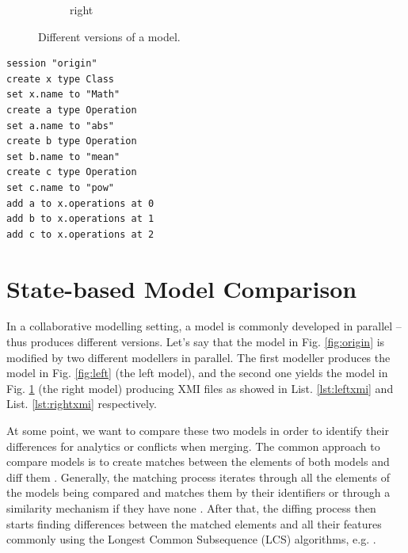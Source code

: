\documentclass{llncs}
\begin{document}
\begin{minipage}[t]{0.59\linewidth}
\begin{figure}[H]
\begin{subfigure}[t]{0.2\linewidth}
    \caption{right}
    \label{fig:right}
\end{subfigure}
\hfill
\label{fig:versions}
\caption{Different versions of a model.}
\end{figure}
\end{minipage}
\hfill
\begin{minipage}[t]{0.39\linewidth}
\begin{lstlisting}[style=eol,caption={The pseudo-formatted CBP of the model in Fig. \ref{fig:origin}.},label=lst:origincbp]
session "origin"
create x type Class
set x.name to "Math" 
create a type Operation
set a.name to "abs" 
create b type Operation
set b.name to "mean" 
create c type Operation
set c.name to "pow" 
add a to x.operations at 0
add b to x.operations at 1
add c to x.operations at 2
\end{lstlisting}
\end{minipage}

\vspace{-5pt}
\section{State-based Model Comparison}
\label{sec:model_comparison}

\vspace{-5pt}
In a collaborative modelling setting, a model is commonly developed in parallel -- thus produces different versions. Let's say that the model in Fig. \ref{fig:origin} is modified by two different modellers in parallel. The first modeller produces the model in Fig. \ref{fig:left} (the left model), and the second one yields the model in Fig. \ref{fig:right} (the right model) producing XMI files as showed in List. \ref{lst:leftxmi} and List. \ref{lst:rightxmi} respectively.

At some point, we want to compare these two models in order to identify their differences for analytics or conflicts when merging. The common approach to compare models is to create matches between the elements of both models and diff them \cite{DBLP:conf/sfm/BroschKLSWW12,emfcompare2018developer}. Generally, the matching process iterates through all the elements of the models being compared and matches them by their identifiers or through a similarity mechanism if they have none \cite{DBLP:conf/sfm/BroschKLSWW12,emfcompare2018developer}. After that, the diffing process then starts finding differences between the matched elements and all their features commonly using the Longest Common Subsequence (LCS) algorithms, e.g. \cite{DBLP:journals/algorithmica/Meyers86}. 
\end{document}
